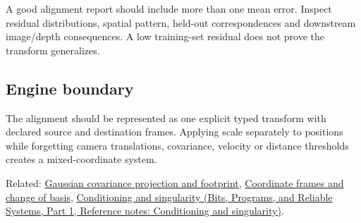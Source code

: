 A good alignment report should include more than one mean error. Inspect residual distributions, spatial pattern, held-out correspondences and downstream image/depth consequences. A low training-set residual does not prove the transform generalizes.

\subsection{Engine boundary}\label{appendix-5f40b4fea463-engine-boundary}

\hypertarget{appendix-5f40b4fea463-engine-boundary}{}

The alignment should be represented as one explicit typed transform with declared source and destination frames. Applying scale separately to positions while forgetting camera translations, covariance, velocity or distance thresholds creates a mixed-coordinate system.

Related: \hyperref[appendix-24269cb6977c]{Gaussian covariance projection and footprint}, \hyperref[appendix-1bae9457dbc3]{Coordinate frames and change of basis}, \href{../01-Bits-Programs-and-Reliable-Systems-P01/main.pdf\#nameddest=appendix-8f6a01f284a7}{Conditioning and singularity (Bits, Programs, and Reliable Systems, Part 1, Reference notes: Conditioning and singularity)}.

